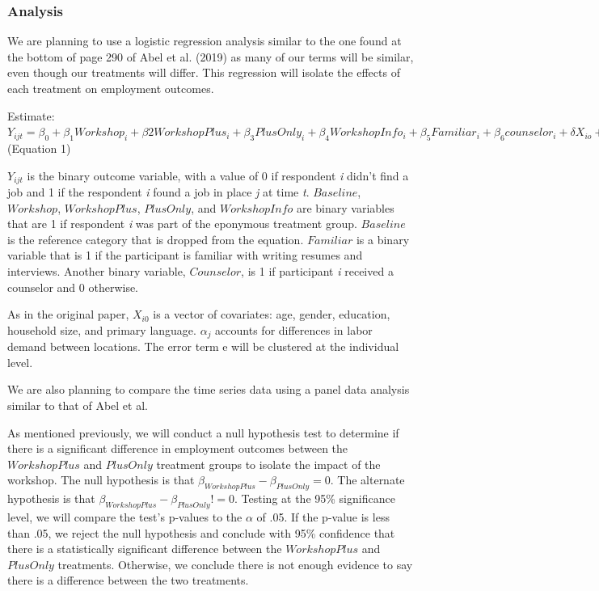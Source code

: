 \documentclass[]{elsarticle} %
\begin{document}
\subsubsection{Analysis}\label{analysis}

We are planning to use a logistic regression analysis similar to the one
found at the bottom of page 290 of Abel et al. (2019) as many of our
terms will be similar, even though our treatments will differ. This
regression will isolate the effects of each treatment on employment
outcomes.

Estimate:
\(Y_{ijt} = \beta_0 + \beta_1Workshop_i + \beta2 WorkshopPlus_i + \beta_3PlusOnly_i + \beta_4WorkshopInfo_i +\beta_5 Familiar_i + \beta_6 counselor_i + \delta X_{io} + \alpha_j + e_i\)
(Equation 1)

\(Y_{ijt}\) is the binary outcome variable, with a value of 0 if
respondent \emph{i} didn't find a job and 1 if the respondent \emph{i}
found a job in place \emph{j} at time \emph{t}. \(Baseline\),
\(Workshop\), \(WorkshopPlus\), \(PlusOnly\), and \(WorkshopInfo\) are
binary variables that are 1 if respondent \emph{i} was part of the
eponymous treatment group. \(Baseline\) is the reference category that
is dropped from the equation. \(Familiar\) is a binary variable that is
1 if the participant is familiar with writing resumes and interviews.
Another binary variable, \(Counselor\), is 1 if participant \emph{i}
received a counselor and 0 otherwise.

As in the original paper, \(X_{i0}\) is a vector of covariates: age,
gender, education, household size, and primary language. \(\alpha_j\)
accounts for differences in labor demand between locations. The error
term e will be clustered at the individual level.

We are also planning to compare the time series data using a panel data
analysis similar to that of Abel et al.

As mentioned previously, we will conduct a null hypothesis test to
determine if there is a significant difference in employment outcomes
between the \(WorkshopPlus\) and \(PlusOnly\) treatment groups to
isolate the impact of the workshop. The null hypothesis is that
\(\beta_{WorkshopPlus} - \beta_{PlusOnly} = 0\). The alternate
hypothesis is that \(\beta_{WorkshopPlus} - \beta_{PlusOnly} != 0\).
Testing at the 95\% significance level, we will compare the test's
p-values to the \(\alpha\) of .05. If the p-value is less than .05, we
reject the null hypothesis and conclude with 95\% confidence that there
is a statistically significant difference between the \(WorkshopPlus\)
and \(PlusOnly\) treatments. Otherwise, we conclude there is not enough
evidence to say there is a difference between the two treatments.
\end{document}
